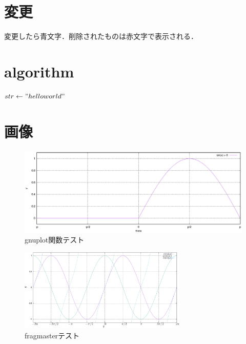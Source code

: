 \section{変更}
変更したら青文字．削除されたものは赤文字で表示される．

\section{algorithm}
\begin{algorithmic}
    \State $str \gets "hello world"$
    \EndFor
    \EndFunction
\end{algorithmic}

\section{画像}

\begin{figure}[t]
    \centering
    \includegraphics[width=\linewidth]{images/gnuplot_func.eps}
    \caption{gnuplot関数テスト}
    \label{fig:func}
\end{figure}

\begin{figure}[t]
    \centering
    \includegraphics[width=8cm]{images/replot.pdf}
    \caption{fragmasterテスト}
    \label{fig:fragmaster}
\end{figure}

